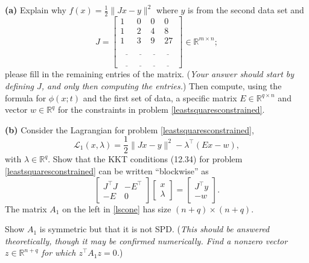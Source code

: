 \documentclass[12pt,reqno]{amsart}
\newcommand{\RR}{\mathbb{R}}
\newcommand{\epart}[1]{\medskip\noindent\textbf{(#1)}\quad }
\begin{document}
\epart{a}  Explain why $f(x) = \frac{1}{2} \|Jx - y\|^2$ where $y$ is from the second data set and
    $$J = \begin{bmatrix}
    1 & 0 & 0 & 0 \\
    1 & 2 & 4 & 8 \\
    1 & 3 & 9 & 27 \\
    \,\,\underline{\phantom{X}} & \underline{\phantom{X}} & \underline{\phantom{X}} & \underline{\phantom{X}}\,\, \\
    \,\,\underline{\phantom{X}} & \underline{\phantom{X}} & \underline{\phantom{X}} & \underline{\phantom{X}}\,\,
    \end{bmatrix} \in \RR^{m\times n};$$
please fill in the remaining entries of the matrix.  (\emph{Your answer should start by \emph{defining} $J$, and only then computing the entries.})  Then compute, using the formula for $\phi(x;t)$ and the first set of data, a specific matrix $E \in \RR^{q\times n}$ and vector $w \in \RR^q$ for the constraints in problem \eqref{leastsquaresconstrained}.

\epart{b}  Consider the Lagrangian for problem \eqref{leastsquaresconstrained},
    $$\mathcal{L}_1(x,\lambda) = \frac{1}{2} \|Jx - y\|^2 - \lambda^\top \left(E x - w\right),$$
with $\lambda \in \RR^q$.  Show that the KKT conditions (12.34) for problem \eqref{leastsquaresconstrained} can be written ``blockwise'' as
\begin{equation}
\begin{bmatrix}
J^\top J & -E^\top \\
- E & 0
\end{bmatrix}
\begin{bmatrix}
x \\ \lambda
\end{bmatrix}
=
\begin{bmatrix}
J^\top y \\
-w
\end{bmatrix}.  \label{lscone}
\end{equation}
The matrix $A_1$ on the left in \eqref{lscone} has size $(n+q) \times (n+q)$.

Show $A_1$ is symmetric but that it is not SPD.  (\emph{This should be answered theoretically, though it may be confirmed numerically.  Find a nonzero vector $z\in \RR^{n+q}$ for which $z^\top A_1 z = 0$.})
\end{document}

